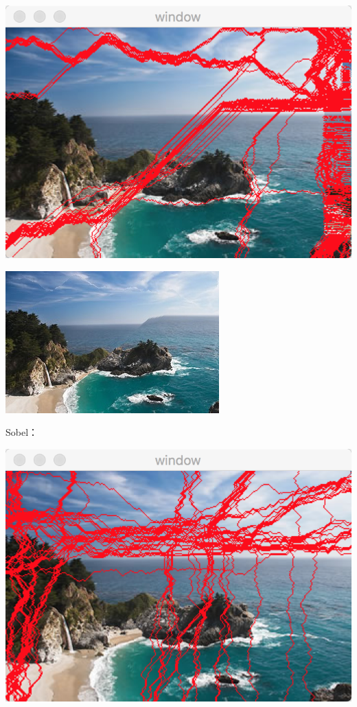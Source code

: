 \documentclass[10pt, a4paper]{article}
\begin{document}
    \includegraphics[scale = .3]{4lapseam.png}

    \includegraphics[scale = .3]{4lap.jpg}

    Sobel：

    \includegraphics[scale = .3]{4sobelseam.png}
\end{document}

